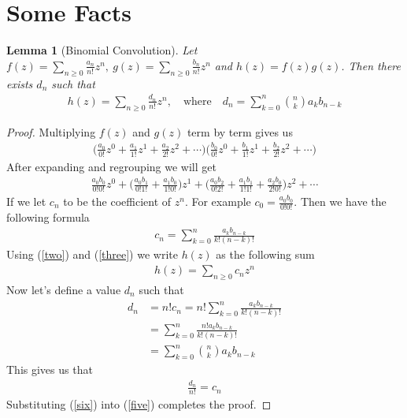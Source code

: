 \documentclass{article}
\newtheorem{lem}[thm]{Lemma}
\theoremstyle{definition}
\newcommand{\ds}[1]{\displaystyle{#1}}  %
\begin{document}
\section{Some Facts}
\begin{lem}[Binomial Convolution]\label{lembc}
Let $\ds f(z)=\sum_{n\ge0}\frac{a_n}{n!}z^n,\ g(z)=\sum_{n\ge0}\frac{b_n}{n!}z^n$ and $h(z)=f(z)g(z)$.
Then there exists $d_n$ such that
\begin{align*}
h(z)=\sum_{n\ge0}\frac{d_n}{n!}z^n,\quad \text{where}\quad d_n=\sum_{k=0}^{n}\binom{n}{k}a_{k}b_{n-k}
\end{align*}
\end{lem}
\begin{proof}
Multiplying $f(z)$ and $g(z)$ term by term gives us
\begin{align*}
\biggl(\frac{a_0}{0!}z^0+\frac{a_1}{1!}z^1+\frac{a_2}{2!}z^2+\cdots\biggl)\biggl(\frac{b_0}{0!}z^0+\frac{b_1}{1!}z^1+\frac{b_2}{2!}z^2+\cdots\biggl)
\end{align*}
After expanding and regrouping we will get
\begin{align}\label{two}
\frac{a_0b_0}{0!0!}z^0+\biggl(\frac{a_0b_1}{0!1!}+\frac{a_1b_0}{1!0!}\biggl)z^1+\biggl(\frac{a_0b_2}{0!2!}+
\frac{a_1b_1}{1!1!}+\frac{a_2b_0}{2!0!}\biggl)z^2+\cdots
\end{align}
If we let $c_n$ to be the coefficient of $z^n$. For example $c_0=\frac{a_0b_0}{0!0!}$. Then we have the following formula
\begin{align}\label{three}
c_n=\sum_{k=0}^{n}\frac{a_kb_{n-k}}{k!(n-k)!}
\end{align}
Using (\ref{two}) and (\ref{three}) we write $h(z)$ as the following sum
\begin{align}\label{five}
h(z)=\sum_{n\ge0}c_nz^n
\end{align}
Now let's define a value $d_n$ such that
\begin{align*}
d_n&=n!c_n=n!\sum_{k=0}^{n}\frac{a_kb_{n-k}}{k!(n-k)!}\\
&=\sum_{k=0}^{n}\frac{n!a_kb_{n-k}}{k!(n-k)!}\\
&=\sum_{k=0}^{n}\binom{n}{k}a_kb_{n-k}
\end{align*}
This gives us that
\begin{align}\label{six}
\frac{d_n}{n!}=c_n
\end{align}
Substituting (\ref{six}) into (\ref{five}) completes the proof.
\end{proof}
\end{document}
